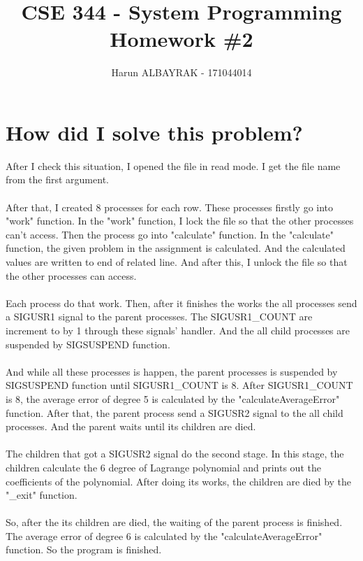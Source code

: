 \documentclass[20pt]{article}
\begin{document}
\title{%
  CSE 344 - System Programming \\
  \large Homework \#2}

\author{Harun ALBAYRAK - 171044014}

\maketitle

\Large
\section{How did I solve this problem?}
After I check this situation, I opened the file in read mode.
I get the file name from the first argument.
\\\\
After that, I created 8 processes for each row. These processes firstly go into "work" function. In the "work" function, I lock the file so that the other processes can't access. Then the process go into "calculate" function. In the "calculate" function, the given problem in the assignment is calculated. And the calculated values are written to end of related line. And after this,  I unlock the file so that the other processes can access.
\\\\
Each process do that work. Then, after it finishes the works the all processes send a SIGUSR1 signal to the parent processes. The SIGUSR1\_COUNT are increment to by 1 through these signals' handler. And the all child processes are suspended by SIGSUSPEND function.
\\\\
And while all these processes is happen, the parent processes is suspended by SIGSUSPEND function until SIGUSR1\_COUNT is 8. After SIGUSR1\_COUNT is 8, the average error of degree 5 is calculated by the "calculateAverageError" function. After that, the parent process send a SIGUSR2 signal to the all child processes. And the parent waits until its children are died.
 \\\\
The children that got a SIGUSR2 signal do the second stage. In this stage, the children calculate the 6 degree of Lagrange polynomial and prints out the coefficients of the polynomial. After doing its works, the children are died by the "\_exit" function.
\\\\
So, after the its children are died, the waiting of the parent process is finished. The average error of degree 6 is calculated by the "calculateAverageError" function. So the program is finished.  
\end{document}
